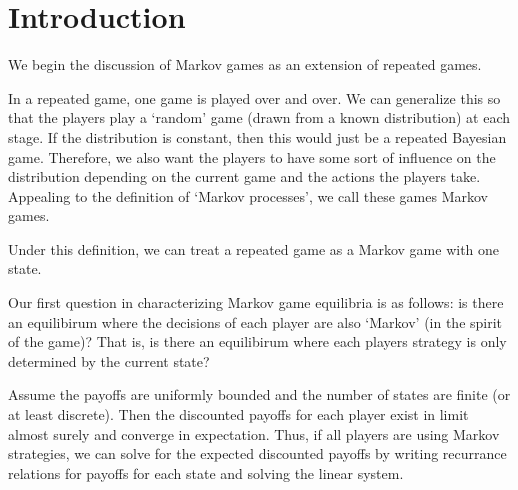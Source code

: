 \section{Introduction}
We begin the discussion of Markov games as an extension of repeated games.

In a repeated game, one game is played over and over. We can generalize this so that the players play a `random' game (drawn from a known distribution) at each stage. If the distribution is constant, then this would just be a repeated Bayesian game. Therefore, we also want the players to have some sort of influence on the distribution depending on the current game and the actions the players take. Appealing to the definition of `Markov processes', we call these games Markov games.
\begin{remark}
    Under this definition, we can treat a repeated game as a Markov game with one state.
\end{remark}

Our first question in characterizing Markov game equilibria is as follows: is there an equilibirum where the decisions of each player are also `Markov' (in the spirit of the game)? That is, is there an equilibirum where each players strategy is only determined by the current state?
\begin{remark}
    Assume the payoffs are uniformly bounded and the number of states are finite (or at least discrete). Then the discounted payoffs for each player exist in limit almost surely and converge in expectation. Thus, if all players are using Markov strategies, we can solve for the expected discounted payoffs by writing recurrance relations for payoffs for each state and solving the linear system.
\end{remark}

